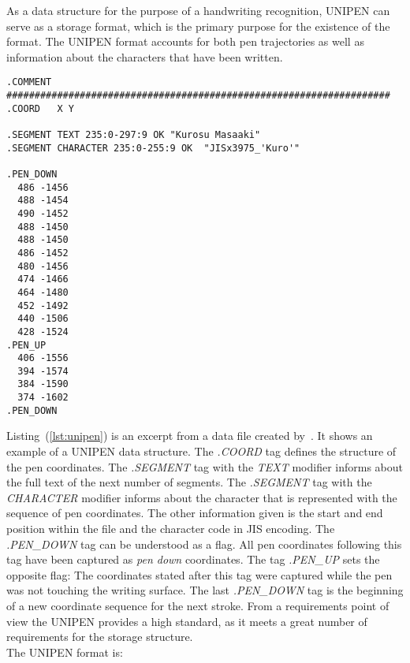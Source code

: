 As a data structure for the purpose of a handwriting recognition, UNIPEN can 
serve as a storage format, which is the primary purpose for the existence of the
format. The UNIPEN format accounts for both pen trajectories as well as 
information about the characters that have been written.
\begin{texcode}
  \begin{lstlisting}[emph={COMMENT,COORD,SEGMENT},emphstyle=\textbf,caption={Demonstration of the \emph{UNIPEN} format},label=lst:unipen]
.COMMENT #################################################################### 
.COORD   X Y

.SEGMENT TEXT 235:0-297:9 OK "Kurosu Masaaki"
.SEGMENT CHARACTER 235:0-255:9 OK  "JISx3975_'Kuro'"

.PEN_DOWN 
  486 -1456 
  488 -1454 
  490 -1452 
  488 -1450 
  488 -1450 
  486 -1452 
  480 -1456 
  474 -1466 
  464 -1480 
  452 -1492 
  440 -1506 
  428 -1524
.PEN_UP 
  406 -1556 
  394 -1574 
  384 -1590 
  374 -1602
.PEN_DOWN 
  \end{lstlisting}
\end{texcode}
Listing~(\ref{lst:unipen}) is an excerpt from a data file created 
by~. It shows an example of a UNIPEN data structure.
The \emph{.COORD} tag defines the structure of the pen coordinates. 
The \emph{.SEGMENT} tag with the \emph{TEXT} modifier informs about the
full text of the next number of segments. The \emph{.SEGMENT} tag with the
\emph{CHARACTER} modifier informs about the character that is represented
with the sequence of pen coordinates. The other information given is the
start and end position within the file and the character code in JIS encoding.
The \emph{.PEN\_DOWN} tag can be understood as a flag. All pen coordinates 
following this tag have been captured as \emph{pen down} coordinates.
The tag \emph{.PEN\_UP} sets the opposite flag: The coordinates stated after 
this tag were captured while the pen was not touching the writing surface.
The last \emph{.PEN\_DOWN} tag is the beginning of a new coordinate sequence
for the next stroke. From a requirements point of view the UNIPEN provides a
high standard, as it meets a great number of requirements for the storage 
structure. \\
The UNIPEN format is:

